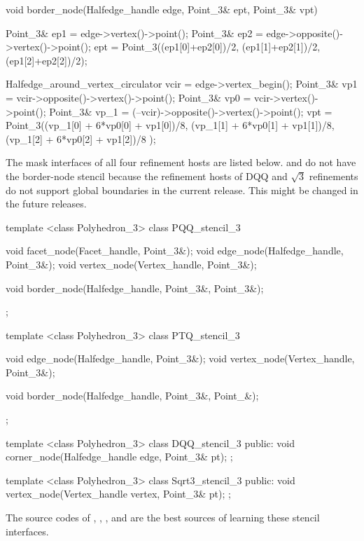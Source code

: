 \begin{ccExampleCode}
  void border_node(Halfedge_handle edge, Point_3& ept, Point_3& vpt) {
    Point_3& ep1 = edge->vertex()->point();
    Point_3& ep2 = edge->opposite()->vertex()->point();
    ept = Point_3((ep1[0]+ep2[0])/2, (ep1[1]+ep2[1])/2, (ep1[2]+ep2[2])/2);

    Halfedge_around_vertex_circulator vcir = edge->vertex_begin();
    Point_3& vp1  = vcir->opposite()->vertex()->point();
    Point_3& vp0  = vcir->vertex()->point();
    Point_3& vp_1 = (--vcir)->opposite()->vertex()->point();
    vpt = Point_3((vp_1[0] + 6*vp0[0] + vp1[0])/8,
                  (vp_1[1] + 6*vp0[1] + vp1[1])/8,
                  (vp_1[2] + 6*vp0[2] + vp1[2])/8 );
  }
\end{ccExampleCode}


The mask interfaces of all four refinement hosts are listed below.
 and  
do not have the border-node stencil because the refinement hosts of
DQQ and $\sqrt{3}$ refinements do not support global boundaries in the 
current release. This might be changed in the future releases.



\begin{ccExampleCode}
template <class Polyhedron_3>
class PQQ_stencil_3 {
  void facet_node(Facet_handle, Point_3&);
  void edge_node(Halfedge_handle, Point_3&);
  void vertex_node(Vertex_handle, Point_3&);

  void border_node(Halfedge_handle, Point_3&, Point_3&);
};

template <class Polyhedron_3>
class PTQ_stencil_3 {
  void edge_node(Halfedge_handle, Point_3&);
  void vertex_node(Vertex_handle, Point_3&);

  void border_node(Halfedge_handle, Point_3&, Point_&);
};

template <class Polyhedron_3>
class DQQ_stencil_3 {
public:
  void corner_node(Halfedge_handle edge, Point_3& pt);
};

template <class Polyhedron_3>
class Sqrt3_stencil_3 {
public:
  void vertex_node(Vertex_handle vertex, Point_3& pt);
};
\end{ccExampleCode}

The source codes of , ,
, and  are
the best sources of learning these stencil interfaces. 


